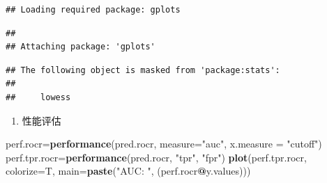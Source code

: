 \documentclass[
]{article}
\newenvironment{Shaded}{\begin{snugshade}}{\end{snugshade}}
\newcommand{\CommentTok}[1]{\textcolor[rgb]{0.56,0.35,0.01}{\textit{#1}}}
\newcommand{\DataTypeTok}[1]{\textcolor[rgb]{0.13,0.29,0.53}{#1}}
\newcommand{\DecValTok}[1]{\textcolor[rgb]{0.00,0.00,0.81}{#1}}
\newcommand{\KeywordTok}[1]{\textcolor[rgb]{0.13,0.29,0.53}{\textbf{#1}}}
\newcommand{\NormalTok}[1]{#1}
\newcommand{\OperatorTok}[1]{\textcolor[rgb]{0.81,0.36,0.00}{\textbf{#1}}}
\newcommand{\OtherTok}[1]{\textcolor[rgb]{0.56,0.35,0.01}{#1}}
\newcommand{\StringTok}[1]{\textcolor[rgb]{0.31,0.60,0.02}{#1}}
\providecommand{\tightlist}{%
  \setlength{\itemsep}{0pt}\setlength{\parskip}{0pt}}
\begin{document}
\begin{verbatim}
## Loading required package: gplots
\end{verbatim}

\begin{verbatim}
## 
## Attaching package: 'gplots'
\end{verbatim}

\begin{verbatim}
## The following object is masked from 'package:stats':
## 
##     lowess
\end{verbatim}

\begin{Shaded}
\end{Shaded}

\begin{enumerate}
\def\labelenumi{\arabic{enumi}.}
\setcounter{enumi}{5}
\tightlist
\item
  性能评估
\end{enumerate}

\begin{Shaded}
\begin{Highlighting}[]
\NormalTok{perf.rocr=}\KeywordTok{performance}\NormalTok{(pred.rocr,}
                      \DataTypeTok{measure=}\StringTok{"auc"}\NormalTok{,}
                      \DataTypeTok{x.measure =} \StringTok{"cutoff"}\NormalTok{)}
\NormalTok{perf.tpr.rocr=}\KeywordTok{performance}\NormalTok{(pred.rocr,}
                          \StringTok{"tpr"}\NormalTok{,}
                          \StringTok{"fpr"}\NormalTok{)}
\KeywordTok{plot}\NormalTok{(perf.tpr.rocr,}
     \DataTypeTok{colorize=}\NormalTok{T,}
     \DataTypeTok{main=}\KeywordTok{paste}\NormalTok{(}\StringTok{"AUC: "}\NormalTok{,}
\NormalTok{                (perf.rocr}\OperatorTok{@}\NormalTok{y.values)))}
\end{Highlighting}
\end{Shaded}
\end{document}
